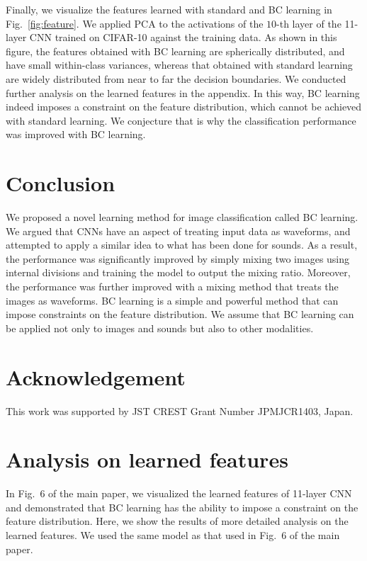 \documentclass[10pt,twocolumn,letterpaper]{article}
\begin{document}
Finally, we visualize the features learned with standard and BC learning in Fig.~\ref{fig:feature}. We applied PCA to the activations of the $10$-th layer of the 11-layer CNN trained on CIFAR-10 against the training data. As shown in this figure, the features obtained with BC learning are spherically distributed, and have small within-class variances, whereas that obtained with standard learning are widely distributed from near to far the decision boundaries. We conducted further analysis on the learned features in the appendix. In this way, BC learning indeed imposes a constraint on the feature distribution, which cannot be achieved with standard learning. We conjecture that is why the classification performance was improved with BC learning.



\section{Conclusion}\label{5}
We proposed a novel learning method for image classification called BC learning. We argued that CNNs have an aspect of treating input data as waveforms, and attempted to apply a similar idea to what has been done for sounds. As a result, the performance was significantly improved by simply mixing two images using internal divisions and training the model to output the mixing ratio. Moreover, the performance was further improved with a mixing method that treats the images as waveforms. BC learning is a simple and powerful method that can impose constraints on the feature distribution. We assume that BC learning can be applied not only to images and sounds but also to other modalities.

\section*{Acknowledgement}
This work was supported by JST CREST Grant Number JPMJCR1403, Japan.

\newpage{\small


}




\newpage
\appendix

\section{Analysis on learned features}
In Fig.~6 of the main paper, we visualized the learned features of 11-layer CNN and demonstrated that BC learning has the ability to impose a constraint on the feature distribution. Here, we show the results of more detailed analysis on the learned features. We used the same model as that used in Fig.~6 of the main paper.
\end{document}
